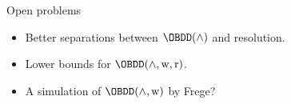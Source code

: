 \begin{frame}{Open problems}

    \begin{itemize}
        \item Better separations between $\OBDD(\land)$ and resolution.
        \item Lower bounds for $\OBDD(\land, \weakening, \reordering)$.
        \item A simulation of $\OBDD(\land, \weakening)$ by Frege?
    \end{itemize}
    
\end{frame}